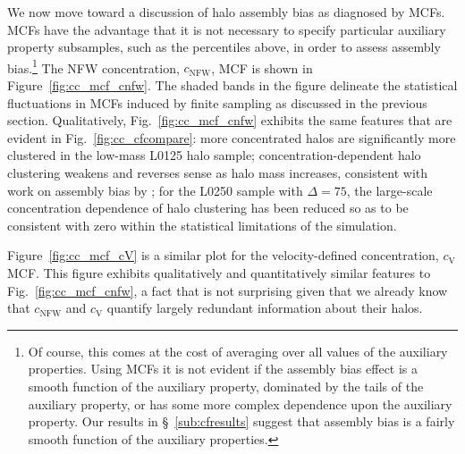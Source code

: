 \documentclass[usenatbib]{mnras}
\begin{document}
We now move toward a discussion of halo assembly bias as diagnosed by MCFs. 
MCFs have the advantage that it is not necessary 
to specify particular auxiliary property subsamples, such as the percentiles above, 
in order to assess assembly bias.\footnote{Of course, this comes at the cost of averaging 
over all values of the auxiliary properties. Using MCFs it is not evident if the assembly bias effect is a smooth
function of the auxiliary property, dominated by the tails of the auxiliary property, or has some more complex
dependence upon the auxiliary property. Our results in \S~\ref{sub:cfresults} suggest that assembly bias is a
fairly smooth function of the auxiliary properties.} 
The NFW concentration, $c_{\mathrm{NFW}}$, MCF is shown in Figure~\ref{fig:cc_mcf_cnfw}. 
The shaded bands in the figure delineate the statistical fluctuations in MCFs induced by 
finite sampling as discussed in the previous section. Qualitatively, 
Fig.~\ref{fig:cc_mcf_cnfw} exhibits the same features that are evident in 
Fig.~\ref{fig:cc_cfcompare}: more concentrated halos are significantly more clustered in 
the low-mass L0125 halo sample; concentration-dependent halo clustering weakens and 
reverses sense as halo mass increases, consistent with work on assembly bias by \citet{sunayama_etal16}; for the 
L0250 sample with $\Delta=75$, the large-scale concentration dependence of halo clustering has been reduced so as to 
be consistent with zero within the statistical limitations of the simulation. 


Figure~\ref{fig:cc_mcf_cV} is a similar plot for the velocity-defined concentration, $c_{\mathrm{V}}$ MCF. 
This figure exhibits qualitatively and quantitatively similar features to Fig.~\ref{fig:cc_mcf_cnfw}, a 
fact that is not surprising given that we already know that $c_{\mathrm{NFW}}$ and $c_{\mathrm{V}}$ 
quantify largely redundant information about their halos.
\end{document}
